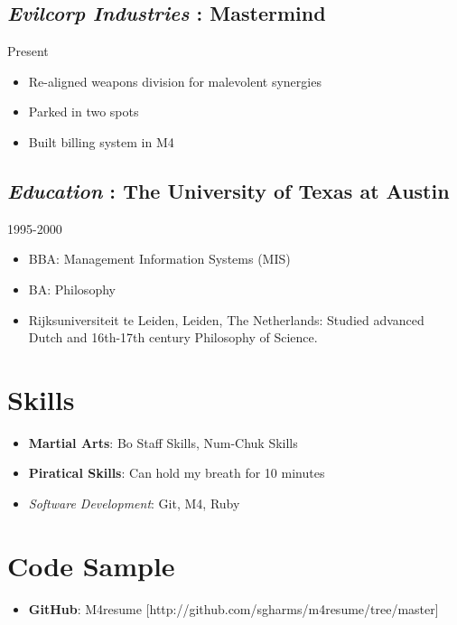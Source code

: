 \documentclass[]{article}
\begin{document}
\subsection*{\textit{Evilcorp Industries} : \textbf{Mastermind}}
  \label{_evilcorpindustries_mastermind}
  \textsf{Present}
\begin{itemize}
    \item Re-aligned weapons division for malevolent synergies
    \item Parked in two spots
    \item Built billing system in M4
\end{itemize}
       
\subsection*{\textit{Education} : \textbf{The University of Texas at Austin}}
  \label{_education_theuniversityoftexasataustin}
  \textsf{1995-2000}
\begin{itemize}
    \item BBA:  Management Information Systems (MIS)
    \item BA:  Philosophy
    \item Rijksuniversiteit te Leiden, Leiden, The Netherlands: Studied advanced Dutch and 16th-17th century Philosophy of Science.
\end{itemize}
       


  \section*{ Skills }
   \begin{itemize}
     \item \textbf{Martial Arts}: Bo Staff Skills, Num-Chuk Skills
     \item \textbf{Piratical Skills}: Can hold my breath for 10 minutes
     \item \textit{Software Development}: Git, M4, Ruby
   \end{itemize}







  \section*{ Code Sample }
   \begin{itemize}
     \item \textbf{GitHub}: M4resume [\textsf{http://github.com/sgharms/m4resume/tree/master}]
   \end{itemize}
\end{document}
